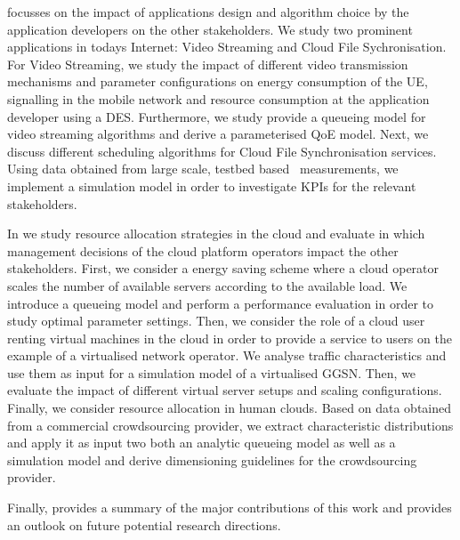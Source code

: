  focusses on the impact of applications design and algorithm choice by the application developers on the other stakeholders.
We study two prominent applications in todays Internet: Video Streaming and Cloud File Sychronisation.
For Video Streaming, we study the impact of different video transmission mechanisms and parameter configurations on energy consumption of the \gls{UE}, signalling in the mobile network and resource consumption at the application developer using a \gls{DES}.
Furthermore, we study provide a queueing model for video streaming algorithms and derive a parameterised \gls{QoE} model.
Next, we discuss different scheduling algorithms for Cloud File Synchronisation services.
Using data obtained from large scale, testbed based~\cite{Chun2003} measurements, we implement a simulation model in order to investigate \glspl{KPI} for the relevant stakeholders.  

In  we study resource allocation strategies in the cloud and evaluate in which management decisions of the cloud platform operators impact the other stakeholders.
First, we consider a energy saving scheme where a cloud operator scales the number of available servers according to the available load.
We introduce a queueing model and perform a performance evaluation in order to study optimal parameter settings.
Then, we consider the role of a cloud user renting virtual machines in the cloud in order to provide a service to users on the example of a virtualised network operator.
We analyse traffic characteristics and use them as input for a simulation model of a virtualised \gls{GGSN}.
Then, we evaluate the impact of different virtual server setups and scaling configurations.
Finally, we consider resource allocation in human clouds.
Based on data obtained from a commercial crowdsourcing provider, we extract characteristic distributions and apply it as input two both an analytic queueing model as well as a simulation model and derive dimensioning guidelines for the crowdsourcing provider.

Finally,  provides a summary of the major contributions of this work and provides an outlook on future potential research directions.
